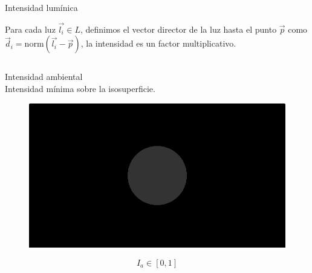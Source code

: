 \begin{frame}{Intensidad lumínica}
    
    Para cada luz \(\Vec{l_i}\in L\), definimos el vector director de la luz hasta el punto \(\Vec{p}\) como  \(\Vec{d}_i=\text{norm}(\Vec{l_i}-\Vec{p})\), la intensidad es un factor multiplicativo.
    
    \vfill
    
    \begin{columns}[onlytextwidth]
        \begin{column}{0.30\textwidth}
            {\Large Intensidad ambiental}\\
            
            Intensidad mínima sobre la isosuperficie. 
            
            \vfill
            \begin{figure}[H]
              \centering
              \includegraphics[width=1.0\textwidth]{imagenes/lightmodel/ambiental.png}
            \end{figure}
            
            \vfill
            \[I_a \in [0,1]\] 
        \end{column}
        

\end{columns}
\end{frame}
